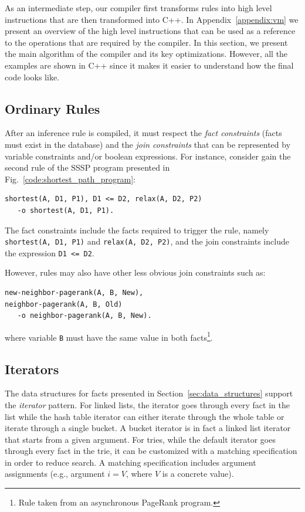 As an intermediate step, our compiler first transforms rules into high level
instructions that are then transformed into C++. In Appendix~\ref{appendix:vm}
we present an overview of the high level instructions that can be used as a
reference to the operations that are required by the compiler. In this
section, we present the main algorithm of the compiler and its key
optimizations. However, all the examples are shown in C++ since it makes it
easier to understand how the final code looks like.

\subsection{Ordinary Rules}\label{sec:compile}

After an inference rule is compiled, it must respect the \emph{fact constraints}
(facts must exist in the database) and the \emph{join constraints} that can be
represented by variable constraints and/or boolean expressions. For instance,
consider gain the second rule of the SSSP program presented in
Fig.~\ref{code:shortest_path_program}:

\begin{Verbatim}[label=example_rule,fontsize=\codesize]
shortest(A, D1, P1), D1 <= D2, relax(A, D2, P2)
   -o shortest(A, D1, P1).
\end{Verbatim}

The fact constraints include the facts required to trigger the rule, namely
\texttt{shortest(A, D1, P1)} and \texttt{relax(A, D2, P2)}, and the join
constraints include the expression \texttt{D1 <= D2}.

However, rules may also have other less obvious join constraints such as:

\begin{Verbatim}[fontsize=\codesize]
new-neighbor-pagerank(A, B, New),
neighbor-pagerank(A, B, Old)
   -o neighbor-pagerank(A, B, New).
\end{Verbatim}

\noindent
where variable \texttt{B} must have the same value in both facts\footnote{Rule taken
from an asynchronous PageRank program.}.

\subsection{Iterators}

The data structures for facts presented in Section~\ref{sec:data_structures}
support the \emph{iterator} pattern. For linked lists, the iterator goes
through every fact in the list while the hash table iterator can either iterate
through the whole table or iterate through a single bucket. A bucket iterator is
in fact a linked list iterator that starts from a given argument.
For tries, while the default iterator goes through every fact in
the trie, it can be customized with a matching specification in
order to reduce search. A matching specification includes argument
assignments (e.g., argument $i = V$, where $V$ is a concrete value).


